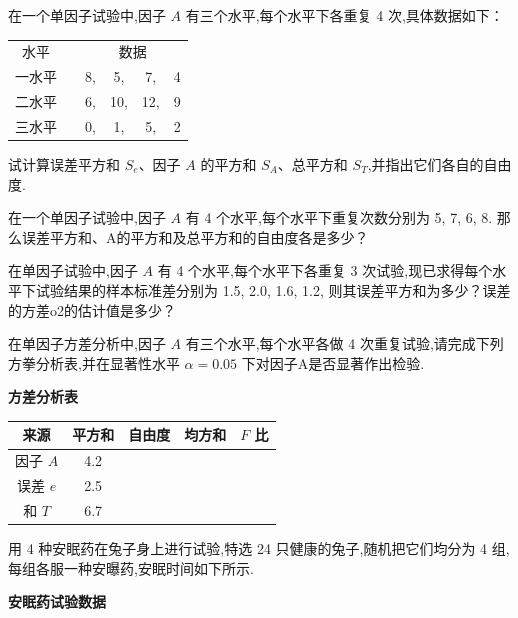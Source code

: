 \begin{xiti}
    \item 在一个单因子试验中,因子 $A$ 有三个水平,每个水平下各重复 4 次,具体数据如下：
    \begin{center}
      \begin{tabular}{cccccc}
        水平    &       & \multicolumn{4}{c}{数据} \\
        一水平   &       & 8,    & 5,    & 7,    & 4 \\
        二水平   &       & 6,    & 10,   & 12,   & 9 \\
        三水平   &       & 0,    & 1,    & 5,    & 2 \\
      \end{tabular}%
    \end{center}
    试计算误差平方和 $S_e$、因子 $A$ 的平方和 $S_A$、总平方和 $S_T$,并指出它们各自的自由度.
    \item 在一个单因子试验中,因子 $A$ 有 4 个水平,每个水平下重复次数分别为 5, 7, 6, 8. 那么误差平方和、A的平方和及总平方和的自由度各是多少？
    \item 在单因子试验中,因子 $A$ 有 4 个水平,每个水平下各重复 3 次试验,现已求得每个水平下试验结果的样本标准差分别为 1.5, 2.0, 1.6, 1.2, 则其误差平方和为多少？误差的方差o2的估计值是多少？
    \item 在单因子方差分析中,因子 $A$ 有三个水平,每个水平各做 4 次重复试验,请完成下列方拳分析表,并在显著性水平 $\alpha=0.05$ 下对因子A是否显著作出检验.
    \begin{center}
      \textbf{方差分析表}\\[1ex]
      \begin{tabular}{ccccc}
        \toprule
        来源    & 平方和 & 自由度 &均方和 & $F$ 比 \\
        \midrule
        因子 $A$   & 4.2   &       &       &  \\
        误差 $e$  & 2.5   &       &       &  \\
        和 $T$   & 6.7   &       &       &  \\
        \bottomrule
        \end{tabular}%
    \end{center}
    \item 用 4 种安眠药在兔子身上进行试验,特选 24 只健康的兔子,随机把它们均分为 4 组,每组各服一种安曝药,安眠时间如下所示.
    \begin{center}
      \textbf{安眠药试验数据}\\[1ex]
    \begin{tabular}{lrrrrrr}

\end{tabular}
\end{center}
\end{xiti}
